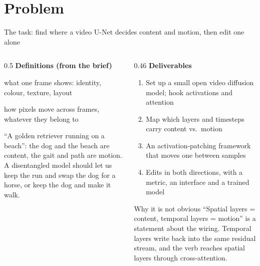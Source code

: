 \documentclass[aspectratio=169,11pt]{beamer}
\begin{document}
\section{Problem}
\begin{frame}{The task: find where a video U-Net decides content and motion, then edit one alone}
  \begin{columns}[T,onlytextwidth]
    \begin{column}{0.5\textwidth}
      \textbf{Definitions (from the brief)}
      \begin{description}[Content]
        \item[\textcolor{content}{Content}] what one frame shows: identity, colour, texture, layout
        \item[\textcolor{motion}{Motion}] how pixels move across frames, whatever they belong to
      \end{description}
      \vspace{2mm}
      ``A golden retriever running on a beach'': the dog and the beach are content, the gait and
      path are motion. A disentangled model should let us keep the run and swap the dog for a
      horse, or keep the dog and make it walk.
    \end{column}
    \begin{column}{0.46\textwidth}
      \textbf{Deliverables}
      \begin{enumerate}\small
        \item Set up a small open video diffusion model; hook activations and attention
        \item Map which layers and timesteps carry content vs.\ motion
        \item An activation-patching framework that moves one between samples
        \item Edits in both directions, with a metric, an interface and a trained model
      \end{enumerate}
      \vspace{1mm}
      \begin{block}{Why it is not obvious}\small
        ``Spatial layers = content, temporal layers = motion'' is a statement about the wiring.
        Temporal layers write back into the same residual stream, and the verb reaches spatial
        layers through cross-attention.
      \end{block}
    \end{column}
  \end{columns}
\end{frame}
\end{document}
